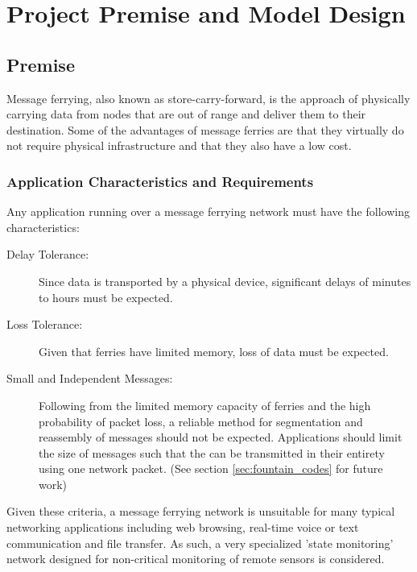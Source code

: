 \chapter{Project Premise and Model Design} 

\section{Premise}



Message ferrying, also known as store-carry-forward, is the approach of physically carrying data from nodes that are out of range and deliver them to their destination. 
Some of the advantages of message ferries are that they virtually do not require physical infrastructure and that they also have a low cost. 

	
\subsection{Application Characteristics and Requirements}

Any application running over a message ferrying network must have the following characteristics:

\begin{description}
\item[Delay Tolerance: ]
Since data is transported by a physical device, significant delays of minutes to hours must be expected.
\item[Loss Tolerance: ]
Given that ferries have limited memory, loss of data must be expected.
\item[Small and Independent Messages: ]
Following from the limited memory capacity of ferries and the high probability of packet loss, a reliable method for segmentation and reassembly of messages should not be expected. 
Applications should limit the size of messages such that the can be transmitted in their entirety using one network packet.
%
(See section \ref{sec:fountain_codes} for future work)
\end{description}

Given these criteria, a message ferrying network is unsuitable for many typical networking applications including web browsing, real-time voice or text communication and file transfer.
As such, a very specialized 'state monitoring' network designed for non-critical monitoring of remote sensors is considered.

